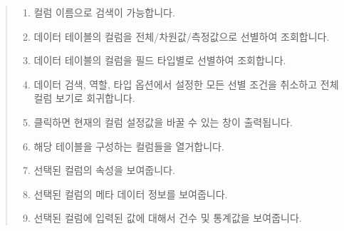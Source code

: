 \documentclass[letterpaper,10pt,english]{sphinxmanual}
\begin{document}
\begin{quote}

\begin{figure}[H]
\centering

\noindent{}
\end{figure}
\begin{enumerate}
\def\theenumi{\arabic{enumi}}
\def\labelenumi{\theenumi .}
\makeatletter\def\p@enumii{\p@enumi \theenumi .}\makeatother
\item {} 
 컬럼 이름으로 검색이 가능합니다.

\item {} 
 데이터 테이블의 컬럼을 전체/차원값/측정값으로 선별하여 조회합니다.

\item {} 
 데이터 테이블의 컬럼을 필드 타입별로 선별하여 조회합니다.

\item {} 
 데이터 검색, 역할, 타입 옵션에서 설정한 모든 선별 조건을 취소하고 전체 컬럼 보기로 회귀합니다.

\item {} 
 클릭하면 현재의 컬럼 설정값을 바꿀 수 있는 창이 출력됩니다.

\item {} 
 해당 테이블을 구성하는 컬럼들을 열거합니다.

\item {} 
 선택된 컬럼의 속성을 보여줍니다.

\item {} 
 선택된 컬럼의 메타 데이터 정보를 보여줍니다.

\item {} 
 선택된 컬럼에 입력된 값에 대해서 건수 및 통계값을 보여줍니다.

\end{enumerate}
\end{quote}

\end{document}

